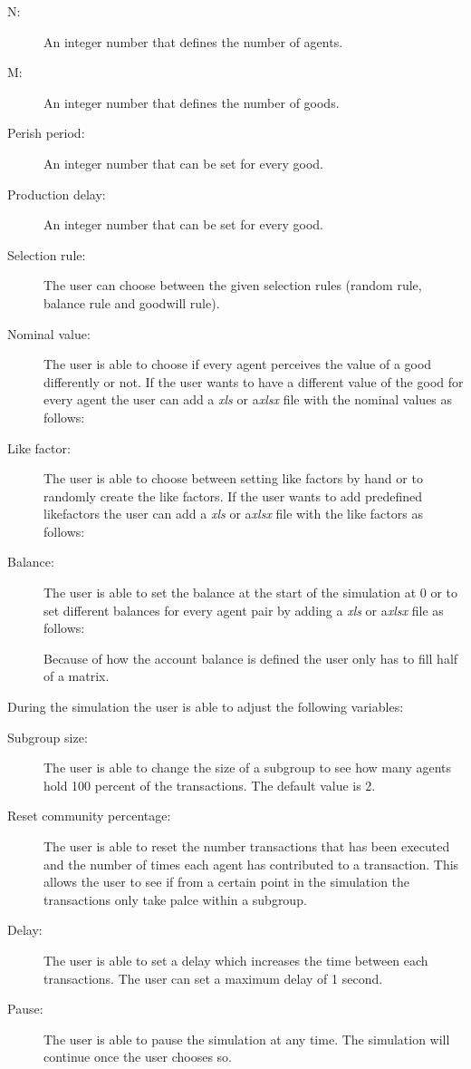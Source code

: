\documentclass[twoside,openright]{uva-bachelor-thesis}
\begin{document}
\begin{description}
  \item[N:] An integer number that defines the number of agents.
  \item[M:] An integer number that defines the number of goods.
  \item[Perish period:] An integer number that can be set for every good.
  \item[Production delay:] An integer number that can be set for every good.
 \item[Selection rule:] The user can choose between the given selection rules (random rule, balance rule and goodwill rule). 
  \item[Nominal value:] The user is able to choose if every agent perceives the value of a good differently or not. If the user wants to have a different value of the good for every agent the user can add a \textit{xls} or a\textit{xlsx} file with the nominal values as follows:
  \item[Like factor:] The user is able to choose between setting like factors by hand or to randomly create the like factors. If the user wants to add predefined likefactors the user can add a \textit{xls} or a\textit{xlsx} file with the like factors as follows:
 \item[Balance:] The user is able to set the balance at the start of the simulation at 0 or to set different balances for every agent pair by adding a  \textit{xls} or a\textit{xlsx} file as follows:

Because of how the account balance is defined the user only has to fill half of a matrix.
\end{description}
During the simulation the user is able to adjust the following variables:

\begin{description}
  \item[Subgroup size:] The user is able to change the size of a subgroup to see how many agents hold 100 percent of the transactions. The default value is 2.
  \item[Reset community percentage:] The user is able to reset the number transactions that has been executed and the number of times each agent has contributed to a transaction. This allows the user to see if from a certain point in the simulation the transactions only take palce within a subgroup.
  \item[Delay:] The user is able to set a delay which increases the time between each transactions. The user can set a maximum delay of 1 second. 
  \item[Pause:] The user is able to pause the simulation at any time. The simulation will continue once the user chooses so.

\end{description}
\end{document}
